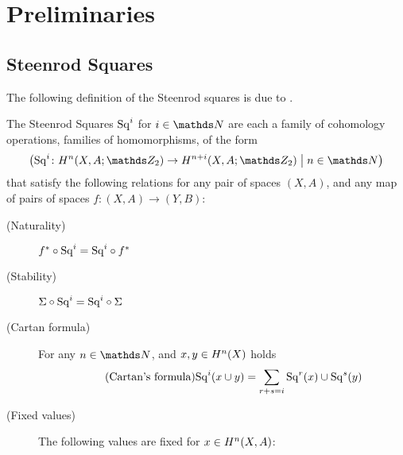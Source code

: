 % 

\chapter{Preliminaries}
\section{Steenrod Squares}

The following definition of the Steenrod squares is due to \cite[Chap.~I.1, p.~1]{steenrodepstein}.
\begin{Def}\label{def:sq}
  The Steenrod Squares $\mathrm{Sq}^{i}$ for $i\in\Nat$ are each a family of
  cohomology operations, \idest families of homomorphisms, of the form
  \begin{gather*}
    \left(
      \Sq i\colon \H^n(X, A;\Zmod2) \to \H^{n+i}(X, A;\Zmod2)
      \;\middle|\;
      n\in\Nat
    \right)
  \end{gather*}
  that satisfy the following relations for any pair of spaces $(X,A)$, and any map of
  pairs of spaces $f\colon (X,A)\to (Y,B)$:
  \begin{description}
  \item[(Naturality)]\label{item:sqnaturality} ${f}^*\circ\mathrm{Sq}^{i} = \mathrm{Sq}^{i}\circ{f}^*$
  \item[(Stability)]\label{item:sqstability} $\Sigma\circ\mathrm{Sq}^{i} = \mathrm{Sq}^{i}\circ\Sigma$
  \item[(Cartan formula)] For any $n\in\Nat$, and $x,y\in H^n(X)$ holds
    \begin{gather}\label{tag:cartan}\tag{Cartan's formula}
      \mathrm{Sq}^{i}(x\cup y) = \sum_{r+s=i}\mathrm{Sq}^{r}(x)\cup\mathrm{Sq}^{s}(y)
    \end{gather}
  \item[(Fixed values)] The following values are fixed for $x\in H^n(X,A)$:

\end{description}
\end{Def}
